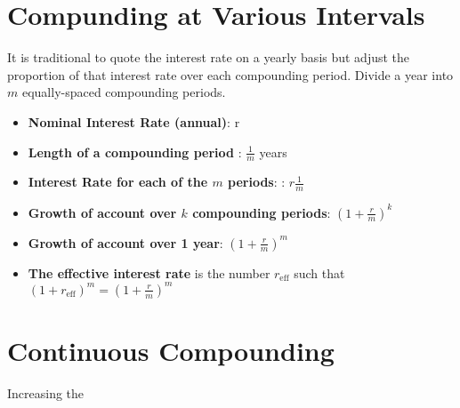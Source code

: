 \section{Compunding at Various Intervals}
It is traditional to quote the interest rate on a yearly basis but adjust the proportion of that interest rate over each compounding period. Divide a year into $m$ equally-spaced compounding periods.
\begin{itemize}
    \item \textbf{Nominal Interest Rate (annual)}: r
    \item \textbf{Length of a compounding period} : \( \frac{1}{m} \) years
    \item \textbf{Interest Rate for each of the $m$ periods}: : \( r \frac{1}{m} \)
    \item \textbf{Growth of account over $k$ compounding periods}: \((1 + \frac{r}{m})^{k} \)
    \item \textbf{Growth of account over 1 year}: \((1 + \frac{r}{m})^{m} \)
    \item \textbf{The effective interest rate} is the number $r_{\text{eff}}$ such that \((1 + r_{\text{eff}})^{m} = (1 + \frac{r}{m})^{m}\)
\end{itemize}

\section{Continuous Compounding}
Increasing the 
